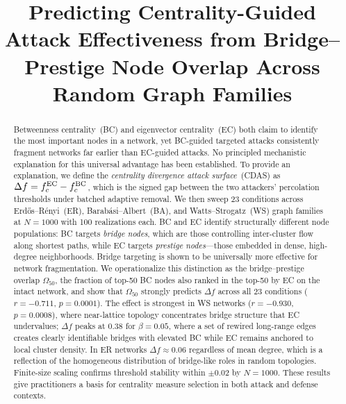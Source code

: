 \documentclass[journal]{IEEEtran}
\begin{document}
\title{Predicting Centrality-Guided Attack Effectiveness from Bridge--Prestige Node Overlap Across Random Graph Families}

\author{
}

\maketitle

\begin{abstract}
Betweenness centrality~(BC) and eigenvector centrality~(EC) both claim
to identify the most important nodes in a network, yet BC-guided targeted
attacks consistently fragment networks far earlier than EC-guided attacks.
No principled mechanistic explanation for this universal advantage has
been established.
To provide an explanation, we define the \emph{centrality divergence attack surface}~(CDAS) as
$\Delta f = f_c^{\rm EC} - f_c^{\rm BC}$, which is the signed gap between the two
attackers' percolation thresholds under batched adaptive removal. We then sweep
23 conditions across Erd\H{o}s--R\'enyi~(ER), Barab\'asi--Albert~(BA),
and Watts--Strogatz~(WS) graph families at $N = 1000$ with 100 realizations
each.
BC and EC identify structurally different node populations: BC targets
\emph{bridge nodes}, which are those controlling inter-cluster flow along shortest
paths, while EC targets \emph{prestige nodes}---those embedded in dense,
high-degree neighborhoods.
Bridge targeting is shown to be universally more effective for network fragmentation.
We operationalize this distinction as the bridge--prestige overlap
$\Omega_{50}$, the fraction of top-50 BC nodes also ranked in the top-50
by EC on the intact network, and show that $\Omega_{50}$ strongly predicts
$\Delta f$ across all 23 conditions ($r = -0.711$, $p = 0.0001$).
The effect is strongest in WS networks ($r = -0.930$, $p = 0.0008$),
where near-lattice topology concentrates bridge structure that EC undervalues; $\Delta f$ peaks at $0.38$ for $\beta = 0.05$,
where a set of rewired long-range edges creates clearly identifiable
bridges with elevated BC while EC remains anchored to local cluster
density.
In ER networks $\Delta f \approx 0.06$ regardless of mean degree, which is a reflection of
the homogeneous distribution of bridge-like roles in random topologies.
Finite-size scaling confirms threshold stability within $\pm 0.02$ by
$N = 1000$.
These results give practitioners a basis for centrality measure
selection in both attack and defense contexts.
\end{abstract}
\end{document}

